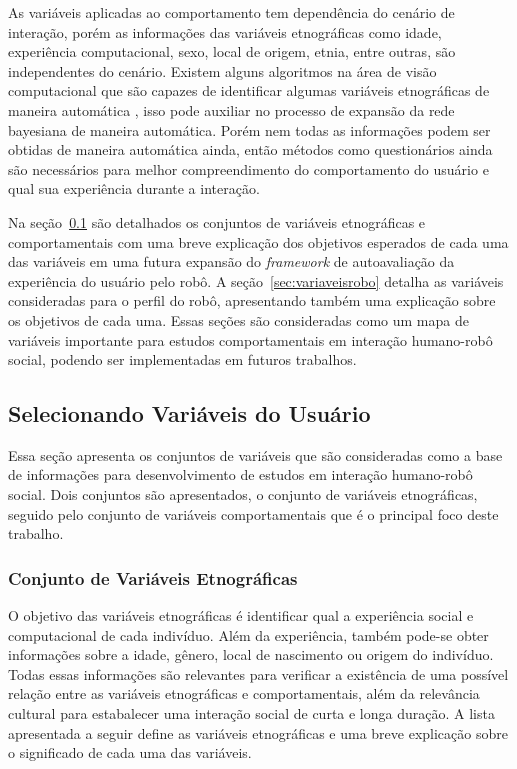 As variáveis aplicadas ao comportamento tem dependência do cenário de interação, porém as informações das variáveis etnográficas como idade, experiência computacional, sexo, local de origem, etnia, entre outras, são independentes do cenário. Existem alguns algoritmos na área de visão computacional que são capazes de identificar algumas variáveis etnográficas de maneira automática \cite{yang:2007, shan:2012, ylioinas:2012, samadi:2013, amaral:2014}, isso pode auxiliar no processo de expansão da rede bayesiana de maneira automática. Porém nem todas as informações podem ser obtidas de maneira automática ainda, então métodos como questionários ainda são necessários para melhor compreendimento do comportamento do usuário e qual sua experiência durante a interação.

Na seção~\ref{sec:variaveisindivíduo} são detalhados os conjuntos de variáveis etnográficas e comportamentais com uma breve explicação dos objetivos esperados de cada uma das variáveis em uma futura expansão do \emph{framework} de autoavaliação da experiência do usuário pelo robô. A seção~\ref{sec:variaveisrobo} detalha as variáveis consideradas para o perfil do robô, apresentando também uma explicação sobre os objetivos de cada uma. Essas seções são consideradas como um mapa de variáveis importante para estudos comportamentais em interação humano-robô social, podendo ser implementadas em futuros trabalhos.

\subsection{Selecionando Variáveis do Usuário}
\label{sec:variaveisindivíduo}

Essa seção apresenta os conjuntos de variáveis que são consideradas como a base de informações para desenvolvimento de estudos em interação humano-robô social. Dois conjuntos são apresentados, o conjunto de variáveis etnográficas, seguido pelo conjunto de variáveis comportamentais que é o principal foco deste trabalho.

\subsubsection{Conjunto de Variáveis Etnográficas}
\label{sec:variaveisetnograficas}

O objetivo das variáveis etnográficas é identificar qual a experiência social e computacional de cada indivíduo. Além da experiência, também pode-se obter informações sobre a idade, gênero, local de nascimento ou origem do indivíduo. Todas essas informações são relevantes para verificar a existência de uma possível relação entre as variáveis etnográficas e comportamentais, além da relevância cultural para estabalecer uma interação social de curta e longa duração. A lista apresentada a seguir define as variáveis etnográficas e uma breve explicação sobre o significado de cada uma das variáveis.

